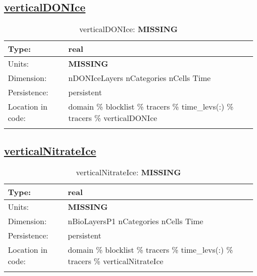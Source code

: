 \subsection[verticalDONIce]{\hyperref[sec:var_tab_tracers]{verticalDONIce}}
\label{subsec:var_sec_tracers_verticalDONIce}
\begin{center}
\begin{longtable}{| p{2.0in} | p{4.0in} |}
        \hline 
        Type: & real \\
        \hline 
        Units: & {\bf \color{red} MISSING} \\
        \hline 
        Dimension: & nDONIceLayers nCategories nCells Time \\
        \hline 
        Persistence: & persistent \\
        \hline 
         Location in code: & domain \% blocklist \% tracers \% time\_levs(:) \% tracers \% verticalDONIce \\
         \hline 
    \caption{verticalDONIce: {\bf \color{red} MISSING}}
\end{longtable}
\end{center}
\subsection[verticalNitrateIce]{\hyperref[sec:var_tab_tracers]{verticalNitrateIce}}
\label{subsec:var_sec_tracers_verticalNitrateIce}
\begin{center}
\begin{longtable}{| p{2.0in} | p{4.0in} |}
        \hline 
        Type: & real \\
        \hline 
        Units: & {\bf \color{red} MISSING} \\
        \hline 
        Dimension: & nBioLayersP1 nCategories nCells Time \\
        \hline 
        Persistence: & persistent \\
        \hline 
         Location in code: & domain \% blocklist \% tracers \% time\_levs(:) \% tracers \% verticalNitrateIce \\
         \hline 
    \caption{verticalNitrateIce: {\bf \color{red} MISSING}}
\end{longtable}
\end{center}
